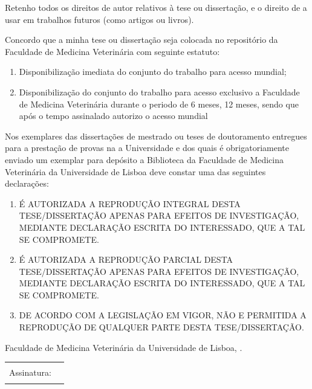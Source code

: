 Retenho todos os direitos de autor relativos à tese ou dissertação, e o direito de a usar em trabalhos futuros (como artigos ou livros).

Concordo que a minha tese ou dissertação seja colocada no repositório da Faculdade de Medicina Veterinária com seguinte estatuto:
\begin{enumerate}
  \item {} Disponibilização imediata do conjunto do trabalho para acesso mundial;
  \item {} Disponibilização do conjunto do trabalho para acesso exclusivo a Faculdade de Medicina Veterinária durante o periodo de  6 meses,
 12 meses, sendo que após o tempo assinalado autorizo o acesso mundial%
\end{enumerate}

{\footnotesize Nos exemplares das dissertações de mestrado ou teses de doutoramento entregues para a prestação de provas na a
Universidade e dos quais é obrigatoriamente enviado um exemplar para depósito a Biblioteca da Faculdade de Medicina
Veterinária da Universidade de Lisboa deve constar uma das seguintes declarações:}
\begin{enumerate}
  \item [\checkbox{reproduction}{I}]
        É AUTORIZADA A REPRODUÇÃO INTEGRAL DESTA TESE/DISSERTAÇÃO APENAS PARA EFEITOS DE INVESTIGAÇÃO,
        MEDIANTE DECLARAÇÃO ESCRITA DO INTERESSADO, QUE A TAL SE COMPROMETE.
  \item [\checkbox{reproduction}{P}]
        É AUTORIZADA A REPRODUÇÃO PARCIAL DESTA TESE/DISSERTAÇÃO APENAS PARA EFEITOS DE INVESTIGAÇÃO,
        MEDIANTE DECLARAÇÃO ESCRITA DO INTERESSADO, QUE A TAL SE COMPROMETE.
  \item [\checkbox{reproduction}{N}]
        DE ACORDO COM A LEGISLAÇÃO EM VIGOR, NÃO E PERMITIDA A REPRODUÇÃO DE QUALQUER PARTE DESTA
        TESE/DISSERTAÇÃO.
\end{enumerate}

Faculdade de Medicina Veterinária da Universidade de Lisboa,
.\par
\vspace*{2ex}
\begin{tabularx}{\linewidth}{@{}lX@{}}
Assinatura: & \rule{\linewidth}{0.75pt}
\end{tabularx}
\egroup
